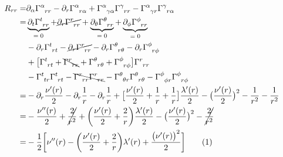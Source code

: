 \documentclass[]{article}
\newcommand\numberthis{\addtocounter{equation}{1}\tag{\theequation}}
\begin{document}
\begin{align*}
	R_{rr} =& \partial_\alpha \Gamma\indices{^\alpha_{rr}} - \partial_r \Gamma\indices{^\alpha_{r\alpha}} + \Gamma\indices{^\alpha_{\gamma\alpha}} \Gamma\indices{^\gamma_{rr}} - \Gamma\indices{^\alpha_{\gamma r}} \Gamma\indices{^\gamma_{r\alpha}}\\
	=& \underbrace{\partial_t \Gamma\indices{^t_{rr}}}_\text{$=0$} + \cancel{\partial_r \Gamma\indices{^r_{rr}} } +\underbrace{\partial_\theta \Gamma\indices{^\theta_{rr}}}_\text{$=0$} + \underbrace{\partial_\phi \Gamma\indices{^\phi_{rr}}}_\text{$=0$}\\
	&- \partial_r \Gamma\indices{^t_{rt}} - \cancel{\partial_r \Gamma\indices{^r_{rr}}} - \partial_r \Gamma\indices{^\theta_{r\theta}} - \partial_r \Gamma\indices{^\phi_{r\phi}}\\
	&+ \big[\Gamma\indices{^t_{rt}} + \bcancel{\Gamma\indices{^r_{rr}}} + \Gamma\indices{^\theta_{r\theta}}  + \Gamma\indices{^\phi_{r\phi}}\big] \Gamma\indices{^r_{rr}}\\
	&- \Gamma\indices{^t_{t r}} \Gamma\indices{^t_{rt}} - \bcancel{\Gamma\indices{^r_{r r}} \Gamma\indices{^r_{rr}}} - \Gamma\indices{^\theta_{\theta r}} \Gamma\indices{^\theta_{r\theta}} - \Gamma\indices{^\phi_{\phi r}} \Gamma\indices{^\phi_{r\phi}}\\
	=& - \partial_r \frac{\nu^\prime(r)}{2}  - \partial_r \frac{1}{r} - \partial_r \frac{1}{r} + \big[\frac{\nu^\prime(r)}{2}  + \frac{1}{r}  + \frac{1}{r}\big] \frac{\lambda^\prime(r)}{2}- \big(\frac{\nu^\prime(r)}{2}\big)^2 -  \frac{1}{r^2}  - \frac{1}{r^2}\\
	=& -\frac{\nu^{\prime\prime}(r)}{2} + \cancel{\frac{2}{r^2}} + \bigg(\frac{\nu^\prime(r)}{2}  + \frac{2}{r}  \bigg) \frac{\lambda^\prime(r)}{2}- \big(\frac{\nu^\prime(r)}{2}\big)^2 -  \cancel{\frac{2}{r^2}} \\
	=& -\frac{1}{2}\bigg[\nu^{\prime\prime}(r) - \bigg(\frac{\nu^\prime(r)}{2}  + \frac{2}{r}  \bigg) \lambda^\prime(r) + \frac{\big(\nu^\prime(r)\big)^2}{2}\bigg] \numberthis \label{eq:Rrr}
\end{align*}
\end{document}
